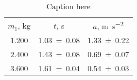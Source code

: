 \begin{table}
\caption{\label{tab:newtable1} Caption here}
\begin{center}
\begin{ruledtabular}
\begin{tabular}{ccc}
$m_1$, \unit{\kilo\gram} & $t$, \unit{\second} & $a$, \unit{\meter\per\second\squared} \\ 
\colrule
\num{1.200} & \num{1.03\pm0.08} & \num{1.33\pm0.22} \\ 
\num{2.400} & \num{1.43\pm0.08} & \num{0.69\pm0.07} \\ 
\num{3.600} & \num{1.61\pm0.04} & \num{0.54\pm0.03} \\ 
\end{tabular}
\end{ruledtabular}
\end{center}
\end{table}
